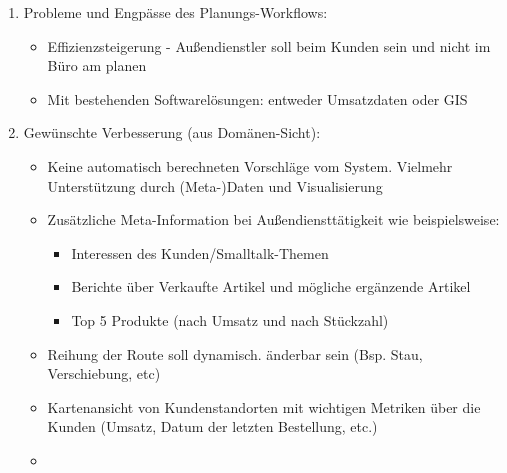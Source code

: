 \documentclass[Bachelorarbeit.tex]{subfiles}
\begin{document}
\begin{enumerate}
\begin{enumerate}
\begin{itemize}
		\end{itemize}
	\end{enumerate}
	\item Probleme und Engpässe des Planungs-Workflows:
	\begin{itemize}
		\item Effizienzsteigerung - Außendienstler soll beim Kunden sein und nicht im Büro am planen
		\item Mit bestehenden Softwarelösungen: entweder Umsatzdaten oder \ac{GIS} 
	\end{itemize}
	\item Gewünschte Verbesserung (aus Domänen-Sicht):
	\begin{itemize}
		\item Keine automatisch berechneten Vorschläge vom System. Vielmehr Unterstützung durch (Meta-)Daten und Visualisierung
		\item Zusätzliche Meta-Information bei Außendiensttätigkeit wie beispielsweise:
		\begin{itemize}
			\item Interessen des Kunden/Smalltalk-Themen
			\item Berichte über Verkaufte Artikel und mögliche ergänzende Artikel
			\item Top 5 Produkte (nach Umsatz und nach Stückzahl)
		\end{itemize}
		\item Reihung der Route soll dynamisch. änderbar sein (Bsp. Stau, Verschiebung, etc)
		\item Kartenansicht von Kundenstandorten mit wichtigen Metriken über die Kunden (Umsatz, Datum der letzten Bestellung, etc.)
		\item 
	\end{itemize}
\end{enumerate}
\newpage
\end{document}
